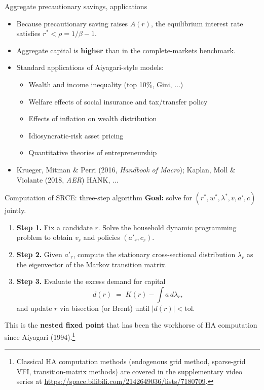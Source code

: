 \begin{frame}{Aggregate precautionary savings, applications}
\begin{itemize}
\item Because precautionary saving raises $A(r)$, the equilibrium interest rate satisfies $r^* < \rho = 1/\beta-1$.
\medskip
\item Aggregate capital is \textbf{higher} than in the complete-markets benchmark.
\medskip
\item Standard applications of Aiyagari-style models:
  \begin{itemize}
  \item Wealth and income inequality (top 10\%, Gini, $\ldots$)
  \item Welfare effects of social insurance and tax/transfer policy
  \item Effects of inflation on wealth distribution
  \item Idiosyncratic-risk asset pricing
  \item Quantitative theories of entrepreneurship
  \end{itemize}
\medskip
\item Krueger, Mitman \& Perri (2016, \emph{Handbook of Macro}); Kaplan, Moll \& Violante (2018, \emph{AER}) HANK, $\ldots$
\end{itemize}
\end{frame}

\begin{frame}{Computation of SRCE: three-step algorithm}
\textbf{Goal:} solve for $(r^*, w^*, \lambda^*, v, a', c)$ jointly.
\medskip

\begin{enumerate}
\item \textbf{Step 1.} Fix a candidate $r$. Solve the household dynamic programming problem to obtain $v_r$ and policies $(a'_r, c_r)$.
\medskip
\item \textbf{Step 2.} Given $a'_r$, compute the stationary cross-sectional distribution $\lambda_r$ as the eigenvector of the Markov transition matrix.
\medskip
\item \textbf{Step 3.} Evaluate the excess demand for capital
\[
d(r) \;=\; K(r) - \int a\,d\lambda_r,
\]
and update $r$ via bisection (or Brent) until $|d(r)|<\text{tol}$.
\end{enumerate}
\medskip
This is the \textbf{nested fixed point} that has been the workhorse of HA computation since Aiyagari (1994).\footnote{\scriptsize Classical HA computation methods (endogenous grid method, sparse-grid VFI, transition-matrix methods) are covered in the supplementary video series at \url{https://space.bilibili.com/2142649036/lists/7180709}.}
\end{frame}

